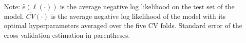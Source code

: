 \documentclass[11pt,a4paper]{article}
\theoremstyle{definition}
\begin{document}
\begin{table}[!ht]
\centering
\caption{Non-parametric and ML benchmarks on the aggregate level}\label{tab:ML-agg}
\begin{threeparttable}
\renewcommand{\TPTminimum}{\linewidth}
\begin{footnotesize}
\end{footnotesize}
\begin{tablenotes}
      \footnotesize
      \item Note: $\hat{e}(\ell(\cdot))$ is the average negative log likelihood on the test set of the model. $\bar{CV}(\cdot)$ is the average negative log likelihood of the model with its optimal hyperparameters averaged over the five CV folds.  Standard error of the cross validation estimation in parentheses.
    \end{tablenotes}
\end{threeparttable}
\end{table}
\end{document}

